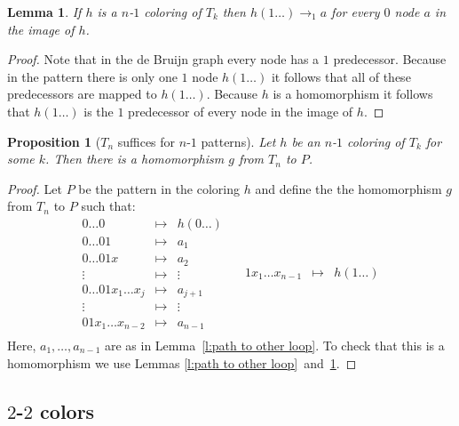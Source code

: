\documentclass[a4paper]{article}
\newtheorem{lemma}[theorem]{Lemma}
\newtheorem{proposition}[theorem]{Proposition}
\begin{document}
\begin{lemma} \label{l:loop sees all}
 If $h$ is a $n$-$1$ coloring of $T_k$ then $h(1\dots) \rightarrow_1 a$
for every $0$ node $a$ in the image of $h$.
\end{lemma}
\begin{proof}
 Note that in the de Bruijn graph every node has a $1$ predecessor.
Because in the pattern there is only one $1$ node $h(1\dots)$ it follows
that all of these predecessors are mapped to $h(1\dots)$. Because $h$ is
a homomorphism it follows that $h(1\dots)$ is the $1$ predecessor of
every node in the image of $h$.
\end{proof}

\begin{proposition}[$T_n$ suffices for $n$-$1$ patterns]
 Let $h$ be an $n$-$1$ coloring of $T_k$ for some $k$. Then
there is a homomorphism $g$ from $T_n$ to $P$.
\end{proposition}
\begin{proof}
Let $P$ be the pattern in the coloring $h$ and define the the
homomorphism $g$ from $T_n$ to $P$ such that:
\[
 \begin{array}{rcl}
 0\dots0 & \mapsto & h(0\dots) \\
 0\dots01 & \mapsto & a_1 \\
 0\dots01x & \mapsto & a_2 \\
 \vdots & \mapsto & \vdots \\
 0\dots01x_1\dots x_j & \mapsto & a_{j + 1} \\
 \vdots & \mapsto & \vdots \\
 01x_1\dots x_{n - 2} & \mapsto & a_{n - 1} \\
 \end{array} \quad
 \begin{array}{rcl}
 1x_1\dots x_{n - 1} & \mapsto & h(1\dots) \\
 \end{array}
\]
Here, $a_1,\dots,a_{n - 1}$ are as in Lemma~\ref{l:path to other loop}.
To check that this is a homomorphism we use Lemmas \ref{l:path to
other loop}~and~\ref{l:loop sees all}.
\end{proof}

\subsection{$2$-$2$ colors}
\end{document}
